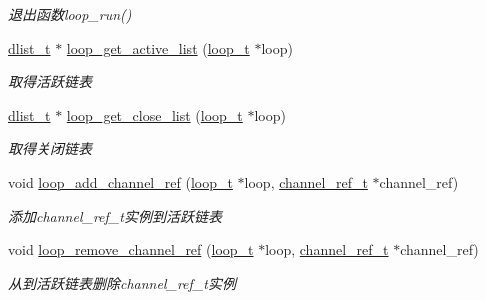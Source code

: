 \begin{DoxyCompactItemize}
\begin{DoxyCompactList}\small\item\em 退出函数loop\+\_\+run() \end{DoxyCompactList}\item 
\hyperlink{a00044_ad6644d67df4b4e3596c1eb12977d1d16_ad6644d67df4b4e3596c1eb12977d1d16}{dlist\+\_\+t} $\ast$ \hyperlink{a00052_a7c1a2360919bfff72d665f2651a8d080_a7c1a2360919bfff72d665f2651a8d080}{loop\+\_\+get\+\_\+active\+\_\+list} (\hyperlink{a00044_a9c3ad1cd2de83e09f3a7b59fa82c94ee_a9c3ad1cd2de83e09f3a7b59fa82c94ee}{loop\+\_\+t} $\ast$loop)
\begin{DoxyCompactList}\small\item\em 取得活跃链表 \end{DoxyCompactList}\item 
\hyperlink{a00044_ad6644d67df4b4e3596c1eb12977d1d16_ad6644d67df4b4e3596c1eb12977d1d16}{dlist\+\_\+t} $\ast$ \hyperlink{a00052_a282fa587372c0abd536f46a396cd41d4_a282fa587372c0abd536f46a396cd41d4}{loop\+\_\+get\+\_\+close\+\_\+list} (\hyperlink{a00044_a9c3ad1cd2de83e09f3a7b59fa82c94ee_a9c3ad1cd2de83e09f3a7b59fa82c94ee}{loop\+\_\+t} $\ast$loop)
\begin{DoxyCompactList}\small\item\em 取得关闭链表 \end{DoxyCompactList}\item 
void \hyperlink{a00052_ab4f4cfdde0b598a3e8267a5ff60775ec_ab4f4cfdde0b598a3e8267a5ff60775ec}{loop\+\_\+add\+\_\+channel\+\_\+ref} (\hyperlink{a00044_a9c3ad1cd2de83e09f3a7b59fa82c94ee_a9c3ad1cd2de83e09f3a7b59fa82c94ee}{loop\+\_\+t} $\ast$loop, \hyperlink{a00044_a151271c9d188ef28d4d24bb81dcc1263_a151271c9d188ef28d4d24bb81dcc1263}{channel\+\_\+ref\+\_\+t} $\ast$channel\+\_\+ref)
\begin{DoxyCompactList}\small\item\em 添加channel\+\_\+ref\+\_\+t实例到活跃链表 \end{DoxyCompactList}\item 
void \hyperlink{a00052_a074c9c3a80a8a5c57b831e41395d4ef5_a074c9c3a80a8a5c57b831e41395d4ef5}{loop\+\_\+remove\+\_\+channel\+\_\+ref} (\hyperlink{a00044_a9c3ad1cd2de83e09f3a7b59fa82c94ee_a9c3ad1cd2de83e09f3a7b59fa82c94ee}{loop\+\_\+t} $\ast$loop, \hyperlink{a00044_a151271c9d188ef28d4d24bb81dcc1263_a151271c9d188ef28d4d24bb81dcc1263}{channel\+\_\+ref\+\_\+t} $\ast$channel\+\_\+ref)
\begin{DoxyCompactList}\small\item\em 从到活跃链表删除channel\+\_\+ref\+\_\+t实例 \end{DoxyCompactList}\item 

\end{DoxyCompactItemize}
